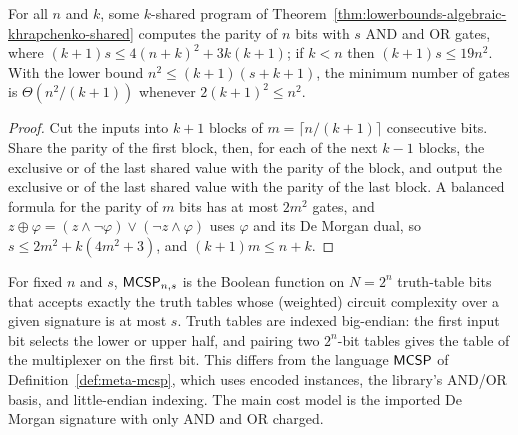 \begin{proposition}
  \label{prop:lowerbounds-algebraic-khrapchenko-shared-upper}
  \leanok
  For all $n$ and $k$, some $k$-shared program of
  Theorem~\ref{thm:lowerbounds-algebraic-khrapchenko-shared} computes the
  parity of $n$ bits with $s$ AND and OR gates, where
  $(k + 1) s \le 4(n + k)^2 + 3k(k + 1)$; if $k < n$ then
  $(k + 1) s \le 19 n^2$. With the lower bound
  $n^2 \le (k + 1)(s + k + 1)$, the minimum number of gates is
  $\Theta(n^2/(k + 1))$ whenever $2(k + 1)^2 \le n^2$.
\end{proposition}
\begin{proof}
  \leanok
  Cut the inputs into $k + 1$ blocks of $m = \lceil n/(k + 1) \rceil$
  consecutive bits. Share the parity of the first block, then, for each of the
  next $k - 1$ blocks, the exclusive or of the last shared value with the
  parity of the block, and output the exclusive or of the last shared value
  with the parity of the last block. A balanced formula for the parity of $m$
  bits has at most $2m^2$ gates, and
  $z \oplus \varphi = (z \wedge \neg\varphi) \vee (\neg z \wedge \varphi)$ uses
  $\varphi$ and its De Morgan dual, so $s \le 2m^2 + k(4m^2 + 3)$, and
  $(k + 1) m \le n + k$.
\end{proof}

\begin{definition}
  \label{def:lowerbounds-algebraic-mcsp}
  \leanok
  For fixed $n$ and $s$, $\mathsf{MCSP}_{n,s}$ is the Boolean function on $N = 2^n$
  truth-table bits that accepts exactly the truth tables whose (weighted)
  circuit complexity over a given signature is at most $s$. Truth tables are
  indexed big-endian: the first input bit selects the lower or upper half, and
  pairing two $2^n$-bit tables gives the table of the multiplexer on the first
  bit. This differs from the language $\mathsf{MCSP}$ of
  Definition~\ref{def:meta-mcsp}, which uses encoded instances, the
  library's AND/OR basis, and little-endian indexing. The main cost model is
  the imported De Morgan signature with only AND and OR charged.
\end{definition}

